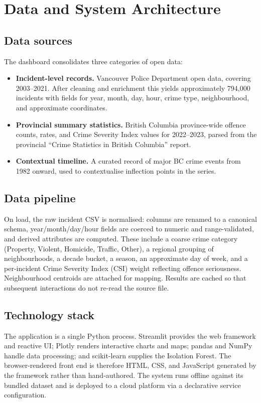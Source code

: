 \documentclass[conference]{IEEEtran}
\begin{document}
\section{Data and System Architecture}

\subsection{Data sources}
The dashboard consolidates three categories of open data:
\begin{itemize}
\item \textbf{Incident-level records.} Vancouver Police Department open data, covering 2003--2021. After cleaning and enrichment this yields approximately 794{,}000 incidents with fields for year, month, day, hour, crime type, neighbourhood, and approximate coordinates.
\item \textbf{Provincial summary statistics.} British Columbia province-wide offence counts, rates, and Crime Severity Index values for 2022--2023, parsed from the provincial ``Crime Statistics in British Columbia'' report.
\item \textbf{Contextual timeline.} A curated record of major BC crime events from 1982 onward, used to contextualise inflection points in the series.
\end{itemize}

\subsection{Data pipeline}
On load, the raw incident CSV is normalised: columns are renamed to a canonical schema, year/month/day/hour fields are coerced to numeric and range-validated, and derived attributes are computed. These include a coarse crime category (Property, Violent, Homicide, Traffic, Other), a regional grouping of neighbourhoods, a decade bucket, a season, an approximate day of week, and a per-incident Crime Severity Index (CSI) weight reflecting offence seriousness. Neighbourhood centroids are attached for mapping. Results are cached so that subsequent interactions do not re-read the source file.

\subsection{Technology stack}
The application is a single Python process. Streamlit provides the web framework and reactive UI; Plotly renders interactive charts and maps; pandas and NumPy handle data processing; and scikit-learn supplies the Isolation Forest. The browser-rendered front end is therefore HTML, CSS, and JavaScript generated by the framework rather than hand-authored. The system runs offline against its bundled dataset and is deployed to a cloud platform via a declarative service configuration.
\end{document}
